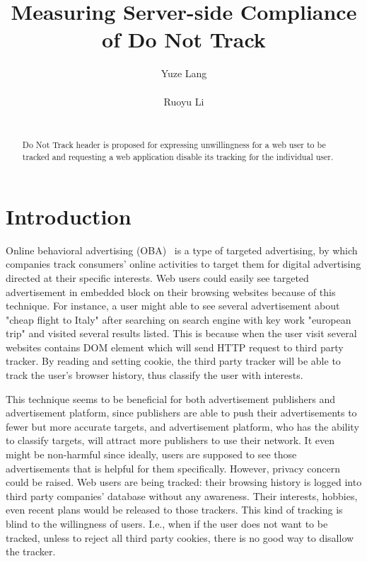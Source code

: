 \documentclass{sig-alternate}
\begin{document}

\title{Measuring Server-side Compliance of Do Not Track}
\author{
\alignauthor
Yuze Lang\\
      \\
\alignauthor
Ruoyu Li\\
      \\
}

\newcommand{\todo}[1]{\textbf{[TODO: #1]}}

\maketitle
\begin{abstract}
Do Not Track header is proposed for expressing unwillingness for a web user to be tracked and requesting a web application disable its tracking for the individual user.
\end{abstract}



\section{Introduction}\label{sec:intro}
Online behavioral advertising (OBA)~\cite{sheltononline} is a type of targeted advertising, by which companies track consumers’ online activities to target them for digital advertising directed at their specific interests. Web users could easily see targeted advertisement in embedded block on their browsing websites because of this technique. For instance, a user might able to see several advertisement about "cheap flight to Italy" after searching on search engine with key work "european trip" and visited several results listed. This is because when the user visit several websites contains DOM element which will send HTTP request to third party tracker. By reading and setting cookie, the third party tracker will be able to track the user's browser history, thus classify the user with interests.

This technique seems to be beneficial for both advertisement publishers and advertisement platform, since publishers are able to push their advertisements to fewer but more accurate targets, and advertisement platform, who has the ability to classify targets, will attract more publishers to use their network. It even might be non-harmful since ideally, users are supposed to see those advertisements that is helpful for them specifically. However, privacy concern could be raised. Web users are being tracked: their browsing history is logged into third party companies' database without any awareness. Their interests, hobbies, even recent plans would be released to those trackers. This kind of tracking is blind to the willingness of users. I.e., when if the user does not want to be tracked, unless to reject all third party cookies, there is no good way to disallow the tracker.
\end{document}
